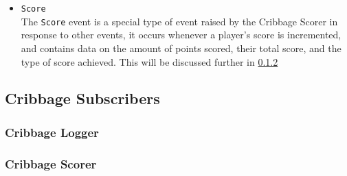 \documentclass{article}
\begin{document}
\begin{itemize}
    \item \verb|Score|\\[2mm]
    The \verb|Score| event is a special type of event raised by the Cribbage Scorer in response to other events, it occurs whenever a player's score is incremented, and contains data on the amount of points scored, their total score, and the type of score achieved. This will be discussed further in \ref{sec: crib scorer}
\end{itemize}


\subsection{Cribbage Subscribers}
\label{sec: crib subscribers}
\subsubsection{Cribbage Logger}
\subsubsection{Cribbage Scorer}
\label{sec: crib scorer}

% 
\end{document}
